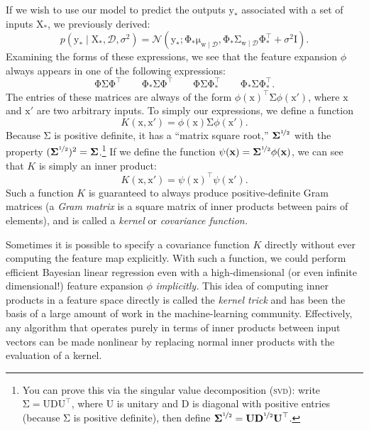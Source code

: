 \documentclass{article}
\newcommand{\acro}[1]{\textsc{\MakeLowercase{#1}}}
\newcommand{\given}{\mid}
\newcommand{\mc}[1]{\mathcal{#1}}
\newcommand{\data}{\mc{D}}
\newcommand{\trans}{^\top}
\newcommand{\mat}[1]{\bm{\mathrm{#1}}}
\renewcommand{\vec}[1]{\bm{\mathrm{#1}}}
\begin{document}
If we wish to use our model to predict the outputs $\vec{y}_\ast$
associated with a set of inputs $\mat{X}_\ast$, we previously derived:
\begin{equation*}
  p(\vec{y}_\ast \given \mat{X}_\ast, \data, \sigma^2)
  =
  \mc{N}(
  \vec{y}_\ast;
  \mat{\Phi}_\ast \vec{\mu}_{\vec{w}\given\data},
  \mat{\Phi}_\ast \mat{\Sigma}_{\vec{w}\given\data} \mat{\Phi}_\ast\trans + \sigma^2 \mat{I}).
\end{equation*}
Examining the forms of these expressions, we see that the feature
expansion $\phi$ always appears in one of the following expressions:
\begin{equation*}
  \mat{\Phi}\mat{\Sigma}\mat{\Phi}\trans
  \qquad
  \mat{\Phi}_\ast\mat{\Sigma}\mat{\Phi}\trans
  \qquad
  \mat{\Phi}\mat{\Sigma}\mat{\Phi}_\ast\trans
  \qquad
  \mat{\Phi}_\ast\mat{\Sigma}\mat{\Phi}_\ast\trans.
\end{equation*}
The entries of these matrices are always of the form
$\phi(\vec{x})\trans \mat{\Sigma} \phi(\vec{x}')$, where $\vec{x}$ and
$\vec{x}'$ are two arbitrary inputs.  To simply our expressions, we
define a function
\begin{equation*}
  K(\vec{x}, \vec{x}')
  =
  \phi(\vec{x})\mat{\Sigma}\phi(\vec{x}').
\end{equation*}
Because $\mat{\Sigma}$ is positive definite, it has a ``matrix square
root,'' $\mat{\Sigma}^{\nicefrac{1}{2}}$ with the property
$(\mat{\Sigma}^{\nicefrac{1}{2}})^2 = \mat{\Sigma}$.\footnote{You can
  prove this via the singular value decomposition (\acro{SVD}): write
  $\mat{\Sigma} = \mat{U}\mat{D}\mat{U}\trans$, where $\mat{U}$ is
  unitary and $\mat{D}$ is diagonal with positive entries (because
  $\mat{\Sigma}$ is positive definite), then define
  $\mat{\Sigma}^{\nicefrac{1}{2}} =
  \mat{U}\mat{D}^{\nicefrac{1}{2}}\mat{U}\trans$.} If we define the
function $\psi(\vec{x}) =
\mat{\Sigma}^{\nicefrac{1}{2}}\phi(\vec{x})$, we can see that
$K$ is simply an inner product:
\begin{equation*}
  K(\vec{x}, \vec{x}')
  =
  \psi(\vec{x})\trans \psi(\vec{x}').
\end{equation*}
Such a function $K$ is guaranteed to always produce positive-definite
Gram matrices (a \emph{Gram matrix} is a square matrix of inner
products between pairs of elements), and is called a \emph{kernel} or
\emph{covariance function.}

Sometimes it is possible to specify a covariance function $K$ directly
without ever computing the feature map explicitly.  With such a
function, we could perform efficient Bayesian linear regression even
with a high-dimensional (or even infinite dimensional!) feature
expansion $\phi$ \emph{implicitly.} This idea of computing inner
products in a feature space directly is called the \emph{kernel trick}
and has been the basis of a large amount of work in the
machine-learning community.  Effectively, any algorithm that operates
purely in terms of inner products between input vectors can be made
nonlinear by replacing normal inner products with the evaluation of a
kernel.
\end{document}
